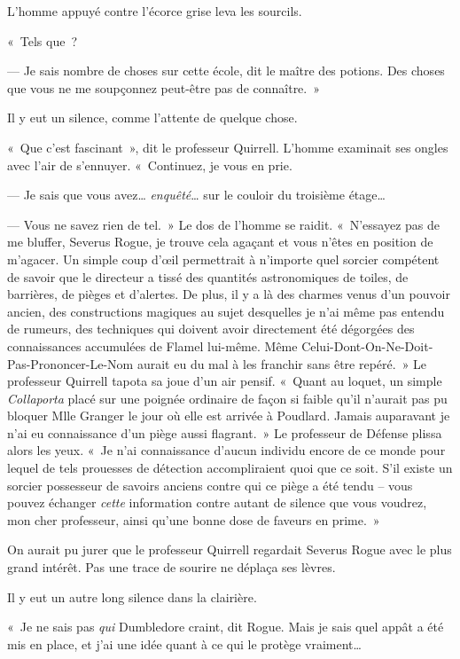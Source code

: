 L'homme appuyé contre l'écorce grise leva les sourcils.

«~Tels que~?

--- Je sais nombre de choses sur cette école, dit le maître des potions. Des choses que vous ne me soupçonnez peut-être pas de connaître.~»

Il y eut un silence, comme l'attente de quelque chose.

«~Que c'est fascinant~», dit le professeur Quirrell. L'homme examinait ses ongles avec l'air de s'ennuyer. «~Continuez, je vous en prie.

--- Je sais que vous avez… \emph{enquêté}… sur le couloir du troisième étage…

--- Vous ne savez rien de tel.~» Le dos de l'homme se raidit. «~N'essayez pas de me bluffer, Severus Rogue, je trouve cela agaçant et vous n'êtes en position de m'agacer. Un simple coup d'œil permettrait à n'importe quel sorcier compétent de savoir que le directeur a tissé des quantités astronomiques de toiles, de barrières, de pièges et d'alertes. De plus, il y a là des charmes venus d'un pouvoir ancien, des constructions magiques au sujet desquelles je n'ai même pas entendu de rumeurs, des techniques qui doivent avoir directement été dégorgées des connaissances accumulées de Flamel lui-même. Même Celui-Dont-On-Ne-Doit-Pas-Prononcer-Le-Nom aurait eu du mal à les franchir sans être repéré.~» Le professeur Quirrell tapota sa joue d'un air pensif. «~Quant au loquet, un simple \emph{Collaporta} placé sur une poignée ordinaire de façon si faible qu'il n'aurait pas pu bloquer Mlle Granger le jour où elle est arrivée à Poudlard. Jamais auparavant je n'ai eu connaissance d'un piège aussi flagrant.~» Le professeur de Défense plissa alors les yeux. «~Je n'ai connaissance d'aucun individu encore de ce monde pour lequel de tels prouesses de détection accompliraient quoi que ce soit. S'il existe un sorcier possesseur de savoirs anciens contre qui ce piège a été tendu -- vous pouvez échanger \emph{cette} information contre autant de silence que vous voudrez, mon cher professeur, ainsi qu'une bonne dose de faveurs en prime.~»

On aurait pu jurer que le professeur Quirrell regardait Severus Rogue avec le plus grand intérêt. Pas une trace de sourire ne déplaça ses lèvres.

Il y eut un autre long silence dans la clairière.

«~Je ne sais pas \emph{qui} Dumbledore craint, dit Rogue. Mais je sais quel appât a été mis en place, et j'ai une idée quant à ce qui le protège vraiment…


